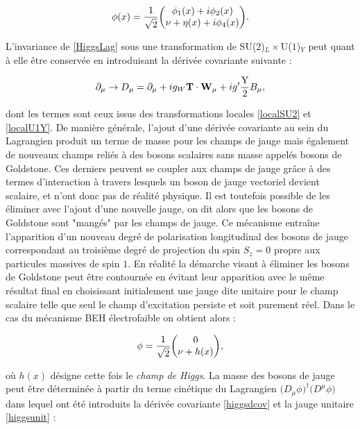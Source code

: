         \begin{equation}
            \phi(x)=\frac{1}{\sqrt{2}}\mqty(\phi_1(x)+i\phi_2(x) \\ \nu+\eta(x)+i\phi_4(x)).
        \end{equation}
        
        L'invariance de \ref{HiggsLag} sous une transformation de SU($2$)$_L\times$U($1$)$_Y$ peut quant à elle être conservée en introduisant la dérivée covariante suivante :

        \begin{equation}
            \partial_{\mu}\rightarrow D_{\mu}=\partial_{\mu}+ig_W\vb{T}\cdot\vb{W}_{\mu}+ig'\frac{\mbox{Y}}{2}B_{\mu},
        \label{higgsdcov}
        \end{equation}

        dont les termes sont ceux issus des transformations locales \ref{localSU2} et \ref{localU1Y}. De manière générale, l'ajout d'une dérivée covariante au sein du Lagrangien produit un terme de masse pour les champs de jauge mais également de nouveaux champs reliés à des bosons scalaires sans masse appelés bosons de Goldstone. Ces derniers peuvent se coupler aux champs de jauge grâce à des termes d'interaction à travers lesquels un boson de jauge vectoriel devient scalaire, et n'ont donc pas de réalité physique. Il est toutefois possible de les éliminer avec l'ajout d'une nouvelle jauge, on dit alors que les bosons de Goldstone sont "mangés" par les champs de jauge. Ce mécanisme entraîne l'apparition d'un nouveau degré de polarisation longitudinal des bosons de jauge correspondant au troisième degré de projection du spin $S_z=0$ propre aux particules massives de spin $1$. En réalité la démarche visant à éliminer les bosons de Goldstone peut être contournée en évitant leur apparition avec le même résultat final en choisissant initialement une jauge dite unitaire pour le champ scalaire telle que seul le champ d'excitation persiste et soit purement réel. Dans le cas du mécanisme BEH électrofaible on obtient alors :

        \begin{equation}
            \phi=\frac{1}{\sqrt{2}}\mqty(0 \\ \nu+h(x)),
        \label{higgsunit}
        \end{equation}

        où $h(x)$ désigne cette fois le \textit{champ de Higgs}. La masse des bosons de jauge peut être déterminée à partir du terme cinétique du Lagrangien $\bigl(D_{\mu}\phi\bigr)^{\dag}\bigl(D^{\mu}\phi\bigr)$ dans lequel ont été introduits la dérivée covariante \ref{higgsdcov} et la jauge unitaire \ref{higgsunit} :

